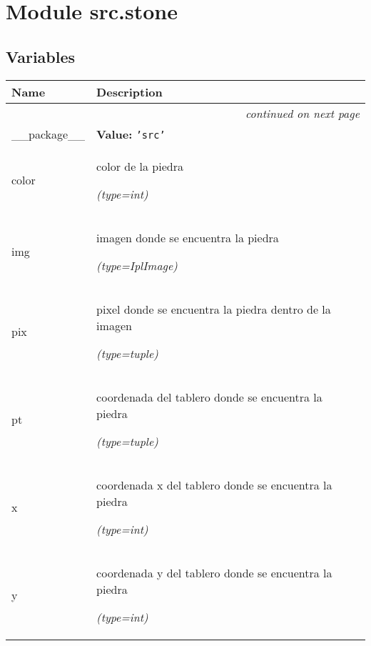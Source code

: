 %
%
%


\section{Module src.stone}

    \label{src:stone}


  \subsection{Variables}

    \vspace{-1cm}
\hspace{\varindent}\begin{longtable}{|p{\varnamewidth}|p{\vardescrwidth}|l}
\cline{1-2}
\cline{1-2} \centering \textbf{Name} & \centering \textbf{Description}& \\
\cline{1-2}
\endhead\cline{1-2}\multicolumn{3}{r}{\small\textit{continued on next page}}\\\endfoot\cline{1-2}
\endlastfoot\raggedright \_\-\_\-p\-a\-c\-k\-a\-g\-e\-\_\-\_\- & \raggedright \textbf{Value:} 
{\tt \texttt{'}\texttt{src}\texttt{'}}&\\
\cline{1-2}
\raggedright c\-o\-l\-o\-r\- & \raggedright color de la piedra

            {\it (type=int)}&\\
\cline{1-2}
\raggedright i\-m\-g\- & \raggedright imagen donde se encuentra la piedra

            {\it (type=IplImage)}&\\
\cline{1-2}
\raggedright p\-i\-x\- & \raggedright pixel donde se encuentra la piedra dentro de la imagen

            {\it (type=tuple)}&\\
\cline{1-2}
\raggedright p\-t\- & \raggedright coordenada del tablero donde se encuentra la piedra

            {\it (type=tuple)}&\\
\cline{1-2}
\raggedright x\- & \raggedright coordenada x del tablero donde se encuentra la piedra

            {\it (type=int)}&\\
\cline{1-2}
\raggedright y\- & \raggedright coordenada y del tablero donde se encuentra la piedra

            {\it (type=int)}&\\
\cline{1-2}
\end{longtable}


